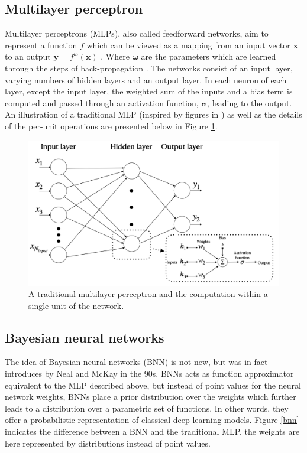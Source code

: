 \documentclass[a4paper,12pt]{report}
\begin{document}
\subsection{Multilayer perceptron}
Multilayer perceptrons (MLPs),  also called feedforward networks, aim to represent a function $f$ which can be viewed as a mapping from an input vector $\bm{x}$ to an output $ \bm{y} = f^{\bm{\omega}}(\bm{x})$ \cite{Goodfellow-et-al-2016}. Where $\bm{\omega}$ are the parameters which are learned through the steps of back-propagation \cite{rumelhart1986learning}. The networks consist of an input layer, varying numbers of hidden layers and an output layer. In each neuron of each layer, except the input layer, the weighted sum of the inputs and a bias term is computed and passed through an activation function, $\bm{\sigma}$, leading to the output. An illustration of a traditional MLP (inspired by figures in \cite{haykin1994neural}) as well as the details of the per-unit operations are presented below in Figure \ref{mlp}.

\begin{figure}[h]
\centering
\includegraphics[width=13cm]{figs/mlp.png}
\caption{A traditional multilayer perceptron and the computation within a single unit of the network.}
\label{mlp}
\end{figure}

\subsection{Bayesian neural networks}
The idea of Bayesian neural networks (BNN)  is not new, but was in fact introduces by Neal \cite{neal2012bayesian} and McKay \cite{mackay1992practical} in the 90s. BNNs acts as function approximator equivalent to the MLP described above, but instead of point values for the neural network weights, BNNs place a prior distribution over the weights which further leads to a distribution over a parametric set of functions. In other words, they offer a probabilistic representation of classical deep learning models. Figure \ref{bnn} indicates the difference between a BNN and the traditional MLP, the weights are here represented by distributions instead of point values.
\end{document}
